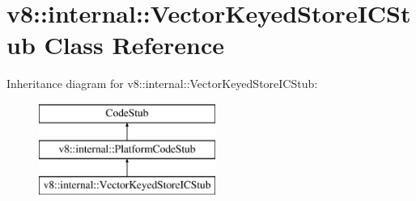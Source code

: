 \hypertarget{classv8_1_1internal_1_1_vector_keyed_store_i_c_stub}{}\section{v8\+:\+:internal\+:\+:Vector\+Keyed\+Store\+I\+C\+Stub Class Reference}
\label{classv8_1_1internal_1_1_vector_keyed_store_i_c_stub}
Inheritance diagram for v8\+:\+:internal\+:\+:Vector\+Keyed\+Store\+I\+C\+Stub\+:\begin{figure}[H]
\begin{center}
\leavevmode
\includegraphics[height=3.000000cm]{classv8_1_1internal_1_1_vector_keyed_store_i_c_stub}
\end{center}
\end{figure}
